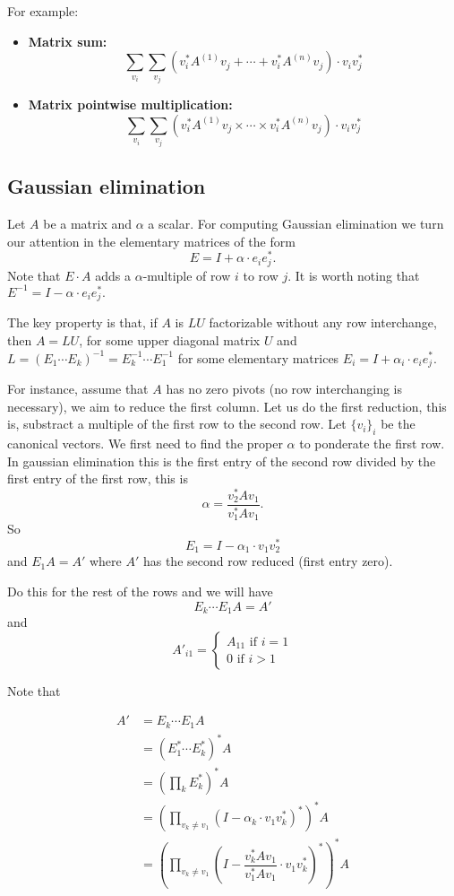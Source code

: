For example:

\begin{itemize}
	\item \textbf{Matrix sum:}$$\sum_{v_i}\sum_{v_j}\left( v_i^*A^{(1)}v_j+ \cdots + v_i^*A^{(n)}v_j\right)\cdot v_iv_j^*$$
	\item \textbf{Matrix pointwise multiplication:} $$\sum_{v_i}\sum_{v_j}\left( v_i^*A^{(1)}v_j\times \cdots\times v_i^*A^{(n)}v_j\right)\cdot v_iv_j^*$$
\end{itemize}

\subsection*{Gaussian elimination}

Let $A$ be a matrix and $\alpha$ a scalar. For computing Gaussian elimination we turn our attention in the elementary matrices of the form $$E=I + \alpha\cdot e_ie_j^*.$$ Note that $E\cdot A$ adds a $\alpha$-multiple of row $i$ to row $j$. It is worth noting that $E^{-1}= I - \alpha\cdot e_ie_j^*.$

The key property is that, if $A$ is $LU$ factorizable without any row interchange, then $A=LU$, for some upper diagonal matrix $U$ and $L=(E_1\cdots E_k)^{-1}=E_k^{-1}\cdots E_1^{-1}$ for some elementary matrices $E_i=I + \alpha_i\cdot e_ie_j^*.$

For instance, assume that $A$ has no zero pivots (no row interchanging is necessary), we aim to reduce the first column. Let us do the first reduction, this is, substract a multiple of the first row to the second row. Let $\lbrace v_i\rbrace_i$ be the canonical vectors. We first need to find the proper $\alpha$ to ponderate the first row. In gaussian elimination this is the first entry of the second row divided by the first entry of the first row, this is $$\alpha = \dfrac{v_2^*Av_1}{v_1^*Av_1}.$$
So $$E_1= I - \alpha_1\cdot v_1v_2^*$$
and $E_1A=A'$ where $A'$ has the second row reduced (first entry zero).

Do this for the rest of the rows and we will have $$E_k\cdots E_1A=A'$$ and
\[
  			A'_{i1}=\begin{cases}
               A_{11} \text{ if } i =1 \\
               0 \text{ if } i > 1
            \end{cases}
		\]

Note that

\begin{align*}
A'&=E_k\cdots E_1A \\
&=\left( E_1^*\cdots E_k^*\right)^*A \\
&=\left(\prod_{k}E_k^*\right)^*A \\
&=\left(\prod_{v_k\neq v_1}\left(I-\alpha_k\cdot v_1v_k^*\right)^*\right)^*A \\
&=\left(\prod_{v_k\neq v_1}\left(I-\dfrac{v_k^*Av_1}{v_1^*Av_1}\cdot v_1v_k^*\right)^*\right)^*A
\end{align*}

